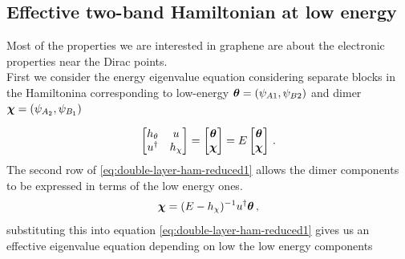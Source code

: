 \subsection*{Effective two-band Hamiltonian at low energy}
Most of the properties we are interested in graphene are about the electronic properties near the Dirac points. \\
First we consider the energy eigenvalue equation considering separate blocks in the Hamiltonina corresponding to low-energy $\boldsymbol{\theta}=(\psi_{A1},\psi_{B2})$ and dimer $\boldsymbol{\chi}= (\psi_{A_2},\psi_{B_1})$

\begin{equation}
\begin{bmatrix}
    h_\theta & u\\
    u^\dag & h_\chi
\end{bmatrix}=
\begin{bmatrix}
    \boldsymbol{\theta}\\
    \boldsymbol{\chi}
\end{bmatrix}=
E\begin{bmatrix}
    \boldsymbol{\theta}\\
    \boldsymbol{\chi}
\end{bmatrix}\,.
\label{eq:double-layer-ham-reduced1}
\end{equation}
The second row of \ref{eq:double-layer-ham-reduced1} allows the dimer components to be expressed in terms of the low energy ones.
\begin{equation}
    \boldsymbol{\chi}=(E-h_\chi)^{-1}u^\dag\boldsymbol{\theta}\,,
    \label{eq:chi-as-theta}
\end{equation} 
substituting this into equation \ref{eq:double-layer-ham-reduced1} gives us an effective eigenvalue equation depending on low the low energy components 


